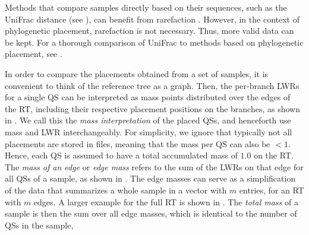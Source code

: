 Methods that compare samples directly based on their sequences,
such as the UniFrac distance \cite{Lozupone2005,Lozupone2007a}
(see ),
can benefit from rarefaction \cite{Weiss2017}.
However, in the context of phylogenetic placement, rarefaction is not necessary.
Thus, more valid data can be kept.
For a thorough comparison of UniFrac to methods based on phylogenetic placement, see \cite{Matsen2011a}.

In order to compare the placements obtained from a set of samples,
it is convenient to think of the reference tree as a graph.
Then, the per-branch \acp{LWR} for a single \ac{QS}
can be interpreted as mass points distributed over the edges of the \ac{RT},
including their respective placement positions on the branches, as shown in .
We call this the \emph{mass interpretation} of the placed \acp{QS},
and henceforth use mass and \ac{LWR} interchangeably.
For simplicity, we ignore that typically not all placements are stored in  files,
meaning that the mass per QS can also be $<1$.
Hence, each \ac{QS} is assumed to have a total accumulated mass of $1.0$ on the \ac{RT}.
The \emph{mass of an edge} or \emph{edge mass} refers to the sum of the \acp{LWR} on that edge for all \acp{QS} of a sample,
as shown in .
The edge masses can serve as a simplification of the data
that summarizes a whole sample in a vector with $m$ entries, for an \ac{RT} with $m$ edges.
A larger example for the full \ac{RT} is shown in .
The \emph{total mass} of a sample is then the sum over all edge masses,
which is identical to the number of \acp{QS} in the sample,

